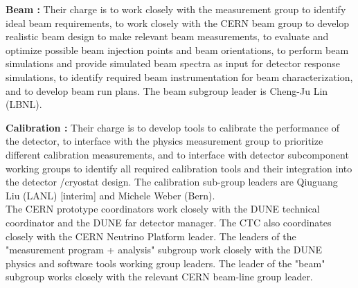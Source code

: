  
{\bf Beam :} Their charge is to work closely with the measurement group to identify ideal beam requirements, to work closely with the CERN beam group to develop realistic beam design to make relevant beam measurements, to evaluate and optimize possible beam injection points and beam orientations, to perform beam simulations and provide simulated beam spectra as input for detector response simulations, to identify required beam instrumentation for beam characterization, and to develop beam run plans.
The  beam subgroup leader is Cheng-Ju Lin (LBNL).


{\bf Calibration :}  Their charge is to develop tools to calibrate the performance of the detector, to interface with the physics measurement group to prioritize different calibration measurements, and to interface with detector subcomponent working groups to identify all required calibration tools and their integration into the detector /cryostat design.
The calibration sub-group leaders are Qiuguang Liu (LANL) [interim] and Michele Weber (Bern).\\


The CERN prototype coordinators work closely with the DUNE technical coordinator and the DUNE far detector manager.
The CTC also coordinates closely with the CERN Neutrino Platform leader.
The leaders of the "measurement program + analysis" subgroup work closely with the DUNE physics and software tools working group leaders. The leader of the "beam" subgroup works closely with the relevant CERN beam-line group leader.

